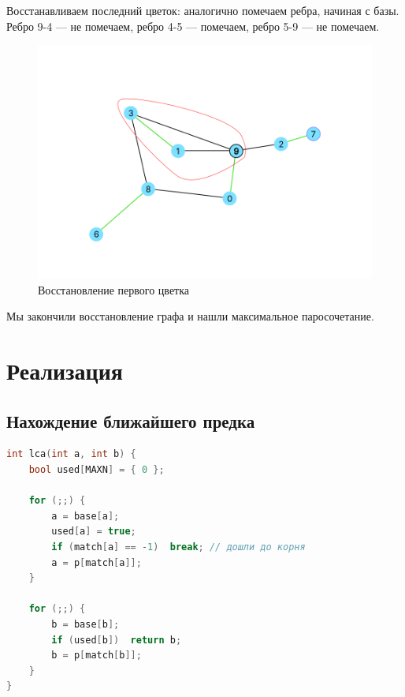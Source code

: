 \documentclass[14pt, a4paper]{extarticle}
\begin{document}
    \pagebreak

    Восстанавливаем последний цветок: аналогично помечаем ребра, начиная с базы. Ребро 9-4 --- не помечаем, ребро 4-5 --- помечаем, ребро 5-9 --- не помечаем. 

    \begin{figure}[ht!]
        \centering
        \includegraphics[scale=0.3]{8.png}
        \caption{Восстановление первого цветка}
        \label{fig:my_label}
    \end{figure} 

    Мы закончили восстановление графа и нашли максимальное паросочетание.

    \pagebreak
    
    \section*{Реализация}

    
    \subsection*{Нахождение ближайшего предка}

    \begin{lstlisting}[language=c++]
int lca(int a, int b) {
	bool used[MAXN] = { 0 };
 
	for (;;) {
		a = base[a];
		used[a] = true;
		if (match[a] == -1)  break; // дошли до корня
		a = p[match[a]];
	}
 
	for (;;) {
		b = base[b];
		if (used[b])  return b;
		b = p[match[b]];
	}
}
    \end{lstlisting}
\end{document}
